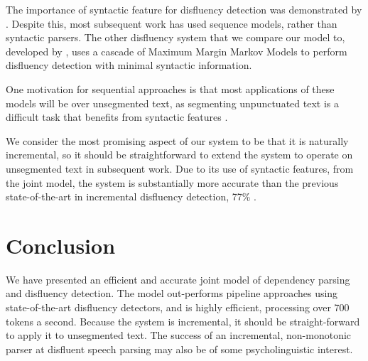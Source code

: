 \documentclass[11pt,letterpaper]{article}
\begin{document}
The importance of syntactic feature for disfluency detection was demonstrated
by \citep{Johnson04a}.
Despite this, most subsequent work has used sequence models, rather than syntactic
parsers.  The other disfluency system that we compare our model to, developed
by \citet{qian:13}, uses a cascade of Maximum Margin Markov Models to perform
disfluency detection with minimal syntactic information.

One motivation for sequential approaches is that most applications of these models will be
over unsegmented text, as segmenting unpunctuated text
is a difficult task that benefits from syntactic features \citep{zhang:13}.

We consider the most promising aspect of our system to be that it is naturally
incremental, so it should be straightforward to extend the system to operate
on unsegmented text in subsequent work.  Due to its use of syntactic features,
from the joint model, the system is substantially more accurate than the previous
state-of-the-art in incremental disfluency detection, 77\% \citep{zwarts:10}.



\section{Conclusion}

We have presented an efficient and accurate joint model of dependency parsing and
disfluency detection.  The model out-performs pipeline approaches using state-of-the-art
disfluency detectors, and is highly efficient, processing over 700 tokens a second.
Because the system is incremental, it should be straight-forward to apply it
to unsegmented text. The success of an incremental, non-monotonic parser at
disfluent speech parsing may also be of some psycholinguistic interest.



\end{document}
